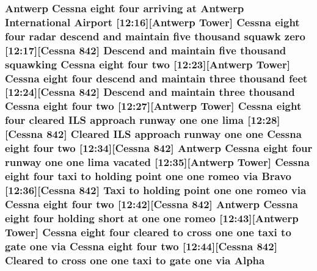 \subsubsection[{\texorpdfstring{Alpha}{Alpha}}]{\setlength{\rightskip}{0pt plus 5cm}Antwerp {\bf Cessna} eight four arriving at Antwerp International {\bf Airport} \mbox{[}12\+:16\mbox{]}\mbox{[}Antwerp {\bf Tower}\mbox{]} {\bf Cessna} eight four radar descend and maintain five {\bf thousand} squawk {\bf zero} \mbox{[}12\+:17\mbox{]}\mbox{[}{\bf Cessna} 842\mbox{]} Descend and maintain five {\bf thousand} {\bf squawking} {\bf Cessna} eight four {\bf two} \mbox{[}12\+:23\mbox{]}\mbox{[}Antwerp {\bf Tower}\mbox{]} {\bf Cessna} eight four descend and maintain three {\bf thousand} {\bf feet} \mbox{[}12\+:24\mbox{]}\mbox{[}{\bf Cessna} 842\mbox{]} Descend and maintain three {\bf thousand} {\bf Cessna} eight four {\bf two} \mbox{[}12\+:27\mbox{]}\mbox{[}Antwerp {\bf Tower}\mbox{]} {\bf Cessna} eight four cleared I\+LS approach runway {\bf one} {\bf one} {\bf lima} \mbox{[}12\+:28\mbox{]}\mbox{[}{\bf Cessna} 842\mbox{]} Cleared I\+LS approach runway {\bf one} {\bf one} {\bf Cessna} eight four {\bf two} \mbox{[}12\+:34\mbox{]}\mbox{[}{\bf Cessna} 842\mbox{]} Antwerp {\bf Cessna} eight four runway {\bf one} {\bf one} {\bf lima} vacated \mbox{[}12\+:35\mbox{]}\mbox{[}Antwerp {\bf Tower}\mbox{]} {\bf Cessna} eight four taxi to holding point {\bf one} {\bf one} {\bf romeo} via {\bf Bravo} \mbox{[}12\+:36\mbox{]}\mbox{[}{\bf Cessna} 842\mbox{]} Taxi to holding point {\bf one} {\bf one} {\bf romeo} via {\bf Cessna} eight four {\bf two} \mbox{[}12\+:42\mbox{]}\mbox{[}{\bf Cessna} 842\mbox{]} Antwerp {\bf Cessna} eight four holding short at {\bf one} {\bf one} {\bf romeo} \mbox{[}12\+:43\mbox{]}\mbox{[}Antwerp {\bf Tower}\mbox{]} {\bf Cessna} eight four cleared to cross {\bf one} {\bf one} taxi to gate {\bf one} via {\bf Cessna} eight four {\bf two} \mbox{[}12\+:44\mbox{]}\mbox{[}{\bf Cessna} 842\mbox{]} Cleared to cross {\bf one} {\bf one} taxi to gate {\bf one} via Alpha}\hypertarget{happyDay2ATC_8txt_a7cf1abcb586a9ec58895379b2b8c1654}{}\label{happyDay2ATC_8txt_a7cf1abcb586a9ec58895379b2b8c1654}
